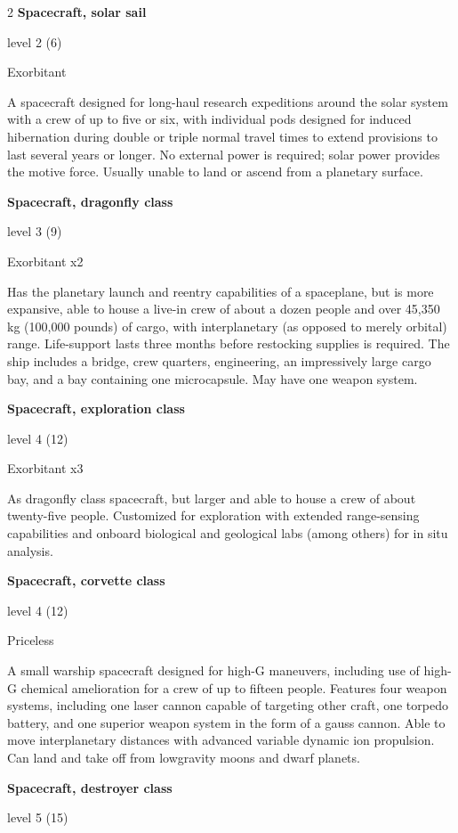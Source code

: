 \begin{multicols}{2}
\textbf{Spacecraft, solar sail} 

level 2 (6) 

Exorbitant 

A spacecraft designed for long-haul research expeditions around the solar system with a crew of up to five or six, with individual pods designed for induced hibernation during double or triple normal travel times to extend provisions to last several years or longer. No external power is required; solar power provides the motive force. Usually unable to land or ascend from a planetary surface. 

\textbf{Spacecraft, dragonfly class} 

level 3 (9) 

Exorbitant x2 

Has the planetary launch and reentry capabilities of a spaceplane, but is more expansive, able to house a live-in crew of about a dozen people and over 45,350 kg (100,000 pounds) of cargo, with interplanetary (as opposed to merely orbital) range. Life-support lasts three months before restocking supplies is required. The ship includes a bridge, crew quarters, engineering, an impressively large cargo bay, and a bay containing one microcapsule. May have one weapon system. 

\textbf{Spacecraft, exploration class} 

level 4 (12) 

Exorbitant x3 

As dragonfly class spacecraft, but larger and able to house a crew of about twenty-five people. Customized for exploration with extended range-sensing capabilities and onboard biological and geological labs (among others) for in situ analysis. 

\textbf{Spacecraft, corvette class} 

level 4 (12) 

Priceless 

A small warship spacecraft designed for high-G maneuvers, including use of high-G chemical amelioration for a crew of up to fifteen people. Features four weapon systems, including one laser cannon capable of targeting other craft, one torpedo battery, and one superior weapon system in the form of a gauss cannon. Able to move interplanetary distances with advanced variable dynamic ion propulsion. Can land and take off from lowgravity moons and dwarf planets. 

\textbf{Spacecraft, destroyer class} 

level 5 (15)


\end{multicols}

